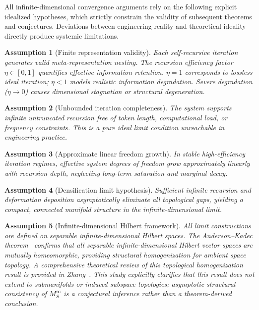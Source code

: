 \documentclass[conference]{IEEEtran}
\newtheorem{assumption}{Assumption}
\theoremstyle{remark}
\begin{document}
All infinite-dimensional convergence arguments rely on the following explicit idealized hypotheses, which strictly constrain the validity of subsequent theorems and conjectures. Deviations between engineering reality and theoretical ideality directly produce systemic limitations.

\begin{assumption}[Finite representation validity]
\label{assum:A}
Each self-recursive iteration generates valid meta-representation nesting. The recursion efficiency factor $\eta\in[0,1]$ quantifies effective information retention. $\eta=1$ corresponds to lossless ideal iteration; $\eta<1$ models realistic information degradation. Severe degradation ($\eta\to0$) causes dimensional stagnation or structural degeneration.
\end{assumption}

\begin{assumption}[Unbounded iteration completeness]
\label{assum:B}
The system supports infinite untruncated recursion free of token length, computational load, or frequency constraints. This is a pure ideal limit condition unreachable in engineering practice.
\end{assumption}

\begin{assumption}[Approximate linear freedom growth]
\label{assum:C}
In stable high-efficiency iteration regimes, effective system degrees of freedom grow approximately linearly with recursion depth, neglecting long-term saturation and marginal decay.
\end{assumption}

\begin{assumption}[Densification limit hypothesis]
\label{assum:D}
Sufficient infinite recursion and deformation deposition asymptotically eliminate all topological gaps, yielding a compact, connected manifold structure in the infinite-dimensional limit.
\end{assumption}

\begin{assumption}[Infinite-dimensional Hilbert framework]
\label{assum:E}
All limit constructions are defined on separable infinite-dimensional Hilbert spaces. The Anderson--Kadec theorem~\cite{anderson1966hilbert} confirms that all separable infinite-dimensional Hilbert vector spaces are mutually homeomorphic, providing structural homogenization for ambient space topology. A comprehensive theoretical review of this topological homogenization result is provided in Zhang~\cite{zhang2002lectures}. This study explicitly clarifies that this result does not extend to submanifolds or induced subspace topologies; asymptotic structural consistency of $M_S^\infty$ is a conjectural inference rather than a theorem-derived conclusion.
\end{assumption}
\end{document}
